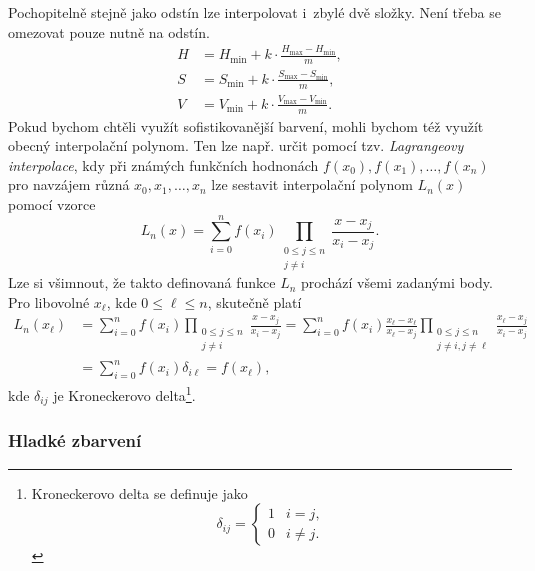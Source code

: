 Pochopitelně stejně jako odstín lze interpolovat i~zbylé dvě složky. Není třeba se omezovat pouze nutně na odstín.
\begin{align*}
    H&=H_{\text{min}}+k\cdot\frac{H_{\text{max}}-H_{\text{min}}}{m},\\
    S&=S_{\text{min}}+k\cdot\frac{S_{\text{max}}-S_{\text{min}}}{m},\\
    V&=V_{\text{min}}+k\cdot\frac{V_{\text{max}}-V_{\text{min}}}{m}.
\end{align*}
Pokud bychom chtěli využít sofistikovanější barvení, mohli bychom též využít obecný interpolační polynom. Ten lze např. určit pomocí tzv. \emph{Lagrangeovy interpolace}, kdy při známých funkčních hodnonách $f(x_0),f(x_1),\ldots,f(x_n)$ pro navzájem různá $x_0,x_1,\ldots,x_n$ lze sestavit interpolační polynom $L_n(x)$ pomocí vzorce
\[L_n(x)=\sum_{i=0}^{n}f(x_i)\prod_{\substack{0\leqslant j\leqslant n\\j\neq i}}{\frac {x-x_{j}}{x_{i}-x_{j}}}.\]
Lze si všimnout, že takto definovaná funkce $L_n$ prochází všemi zadanými body. Pro libovolné $x_\ell$, kde $0\leqslant\ell\leqslant n$, skutečně platí
\begin{align*}
    L_n(x_\ell)&=\sum_{i=0}^{n}f(x_i)\prod_{\substack{0\leqslant j\leqslant n\\j\neq i}}{\frac {x-x_{j}}{x_{i}-x_{j}}}=\sum_{i=0}^{n}f(x_i)\frac{x_\ell-x_\ell}{x_{\ell}-x_{j}}\prod_{\substack{0\leqslant j\leqslant n\\j\neq i,j\neq\ell}}{\frac {x_\ell-x_{j}}{x_{i}-x_{j}}}\\
    &=\sum_{i=0}^{n}f(x_i)\delta_{i\ell}=f(x_\ell),
\end{align*}
kde $\delta_{ij}$ je Kroneckerovo delta\footnote{Kroneckerovo delta se definuje jako
\[\delta_{ij}=\begin{cases}
    1 & i=j,\\
    0 & i\neq j.
\end{cases}\]
}.

\subsubsection{Hladké zbarvení}

